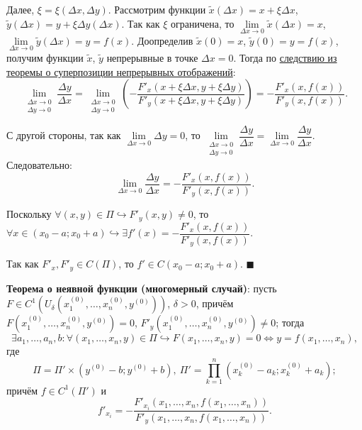 \documentclass[12pt, a4paper, reqno]{article}
\begin{document}
    Далее, $\xi = \xi(\Delta x, \Delta y)$. Рассмотрим функции $\tilde{x}(\Delta x) = x + \xi \Delta x$,
    $\tilde{y}(\Delta x) = y + \xi \Delta y(\Delta x)$. Так как $\xi$ ограничена, то
    $\lim\limits_{\Delta x \to 0} \tilde{x}(\Delta x) = x$,
    $\lim\limits_{\Delta x \to 0} \tilde{y}(\Delta x) = y = f(x)$. Доопределив $\tilde{x}(0) = x$,
    $\tilde{y}(0) = y = f(x)$, получим функции $\tilde{x}$, $\tilde{y}$ непрерывные в точке $\Delta x = 0$.
    Тогда по \hyperlink{continuity-implication}{следствию из теоремы о суперпозиции непрерывных отображений}:
    \begin{equation*}
        \lim\limits_{\substack{\Delta x \to 0 \\ \Delta y \to 0}} \frac{\Delta y}{\Delta x} =
        \lim\limits_{\substack{\Delta x \to 0 \\ \Delta y \to 0}}
        \left(
            -\frac{F'_x(x + \xi\Delta x, y + \xi\Delta y)}{F'_y(x + \xi\Delta x, y + \xi\Delta y)}
        \right) =
        -\frac{F'_x(x, f(x))}{F'_y(x, f(x))}.
    \end{equation*}

    С другой стороны, так как $\lim\limits_{\Delta x \to 0} \Delta y = 0$, то
    $\lim\limits_{\substack{\Delta x \to 0 \\ \Delta y \to 0}} \dfrac{\Delta y}{\Delta x} =
    \lim\limits_{\Delta x \to 0} \dfrac{\Delta y}{\Delta x}$. Следовательно:
    \begin{equation*}
        \lim\limits_{\Delta x \to 0} \frac{\Delta y}{\Delta x} = -\frac{F'_x(x, f(x))}{F'_y(x, f(x))}.
    \end{equation*}

    Поскольку $\forall (x, y) \in \Pi \hookrightarrow F'_y(x, y) \neq 0$, то $\forall x \in (x_0 - a; x_0 + a)
    \hookrightarrow \exists f'(x) = -\dfrac{F'_x(x, f(x))}{F'_y(x, f(x))}$.

    Так как $F'_x, F'_y \in C(\Pi)$, то $f' \in C(x_0 - a; x_0 + a)$.
    $\blacksquare$

    \textbf{Теорема о неявной функции (многомерный случай)}: пусть
    $F \in C^1(U_{\delta}(x_1^{(0)}, \ldots, x_n^{(0)}, y^{(0)}))$, $\delta > 0$, причём
    $F(x_1^{(0)}, \ldots, x_n^{(0)}, y^{(0)}) = 0$, $F'_y(x_1^{(0)}, \ldots, x_n^{(0)}, y^{(0)}) \neq 0$;
    тогда
    \begin{equation*}
        \exists a_1, \ldots, a_n, b: \forall (x_1, \ldots, x_n, y) \in \Pi \hookrightarrow
        F(x_1, \ldots, x_n, y) = 0 \iff y = f(x_1, \ldots, x_n),
    \end{equation*}
    где
    \begin{equation*}
        \Pi = \Pi' \times (y^{(0)} - b; y^{(0)} + b),\
        \Pi' = \prod\limits_{k = 1}^{n} (x_k^{(0)} - a_k; x_k^{(0)} + a_k);
    \end{equation*}
    причём $f \in C^1(\Pi')$ и
    \begin{equation*}
        f'_{x_i} = -\frac{F'_{x_i}(x_1, \ldots, x_n, f(x_1, \ldots, x_n))}{F'_y(x_1, \ldots, x_n, f(x_1, \ldots, x_n))}.
    \end{equation*}
\end{document}

